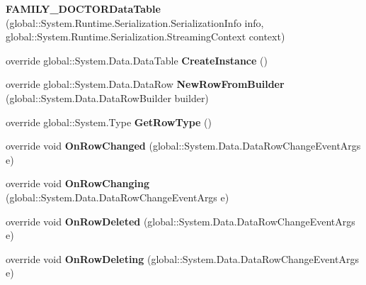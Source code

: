 \begin{CompactItemize}
\item 
\textbf{FAMILY\_\-DOCTORDataTable} (global::System.Runtime.Serialization.SerializationInfo info, global::System.Runtime.Serialization.StreamingContext context)\label{class_automatic_medical_system_1_1_data_set2_1_1_f_a_m_i_l_y___d_o_c_t_o_r_data_table_407624d72480283dc5de74628d5dbedb}

\item 
override global::System.Data.DataTable \textbf{CreateInstance} ()\label{class_automatic_medical_system_1_1_data_set2_1_1_f_a_m_i_l_y___d_o_c_t_o_r_data_table_032a41c76ad93b340c2bda7b88e836cb}

\item 
override global::System.Data.DataRow \textbf{NewRowFromBuilder} (global::System.Data.DataRowBuilder builder)\label{class_automatic_medical_system_1_1_data_set2_1_1_f_a_m_i_l_y___d_o_c_t_o_r_data_table_b079cc93e10eaf8b1354de14e759d799}

\item 
override global::System.Type \textbf{GetRowType} ()\label{class_automatic_medical_system_1_1_data_set2_1_1_f_a_m_i_l_y___d_o_c_t_o_r_data_table_0a143873dbd3e30d90b66be817fac87f}

\item 
override void \textbf{OnRowChanged} (global::System.Data.DataRowChangeEventArgs e)\label{class_automatic_medical_system_1_1_data_set2_1_1_f_a_m_i_l_y___d_o_c_t_o_r_data_table_9a9f8344f5f8f00830a5e7d47bb887d6}

\item 
override void \textbf{OnRowChanging} (global::System.Data.DataRowChangeEventArgs e)\label{class_automatic_medical_system_1_1_data_set2_1_1_f_a_m_i_l_y___d_o_c_t_o_r_data_table_dba46b73c523175b3bb6be96049d6c2f}

\item 
override void \textbf{OnRowDeleted} (global::System.Data.DataRowChangeEventArgs e)\label{class_automatic_medical_system_1_1_data_set2_1_1_f_a_m_i_l_y___d_o_c_t_o_r_data_table_e80b0b4a820af0fb120c133d63d40f26}

\item 
override void \textbf{OnRowDeleting} (global::System.Data.DataRowChangeEventArgs e)\label{class_automatic_medical_system_1_1_data_set2_1_1_f_a_m_i_l_y___d_o_c_t_o_r_data_table_05251887ea0be90c40589174c0b13f7d}

\end{CompactItemize}
